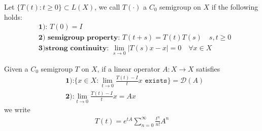 \begin{definition}[$C_0$ semigroup]
	Let $\{T(t) : t \ge 0 \} \subset L(X)$, we call $T(\cdot)$ a $C_0$ semigroup on $X$ if the following holds:
	\begin{align*}
		&\textbf{1): } T(0) = I \\
		&\textbf{2) semigroup property: } T(t + s) = T(t)T(s) \quad s,t \ge 0 \\
		&\textbf{3)strong continuity: } \lim_{ s \rightarrow 0} |T(s)x - x| = 0 \quad \forall x \in X
	\end{align*}
\end{definition}

\begin{definition}
	 Given a $C_0$ semigroup $T$ on $X$, if a linear operator $A: X \rightarrow X$ satisfies 
	 \begin{align*}
	 	&\textbf{1):} \{ x \in X: \lim_{ t \rightarrow 0} \frac{T(t) - I}{t}x \texttt{ exists} \} = \mathcal{D}(A)\\
	 	& \textbf{2):} \lim_{t \rightarrow 0} \frac{T(t) - I}{t}x = Ax
	 \end{align*}
	 we write 
	 \begin{align*}
	 	T(t) = e^{t A} \sum_{n = 0}^\infty \frac{t^n}{n!} A^n 
	 \end{align*}
\end{definition}

